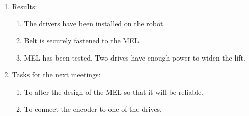 \begin{enumerate}
\begin{enumerate}
	\end{enumerate}
	
	\item Results: 
	\begin{enumerate}
		\item The drivers have been installed on the robot.
		
		\item Belt is securely fastened to the MEL.
		
		\item MEL has been tested. Two drives have enough power to widen the lift.
		
	\end{enumerate}
	
	\item Tasks for the next meetings:
	\begin{enumerate}
		\item To alter the design of the MEL so that it will be reliable.
		
		\item To connect the encoder to one of the drives.
		
	\end{enumerate}     
\end{enumerate}
\fillpage
